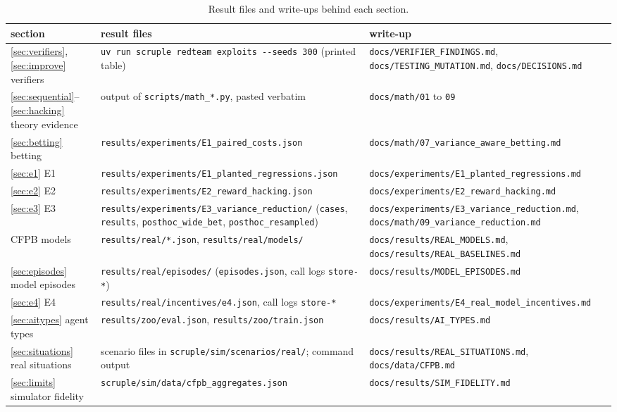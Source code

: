 \documentclass[11pt]{article}
\theoremstyle{definition}
\theoremstyle{remark}
\newcommand{\1}{\mathbf{1}}
\begin{document}
\begin{table}[h]
\centering\scriptsize
\caption{Result files and write-ups behind each section.}\label{tab:files}
\begin{tabularx}{\linewidth}{@{}l>{\raggedright\arraybackslash\hsize=0.85\hsize}X>{\raggedright\arraybackslash\hsize=1.15\hsize}X@{}}
\toprule
section & result files & write-up\\
\midrule
\ref{sec:verifiers}, \ref{sec:improve} verifiers & \texttt{uv run scruple redteam exploits -{}-seeds 300} (printed table) & \nolinkurl{docs/VERIFIER_FINDINGS.md}, \nolinkurl{docs/TESTING_MUTATION.md}, \nolinkurl{docs/DECISIONS.md}\\
\ref{sec:sequential}--\ref{sec:hacking} theory evidence & output of \nolinkurl{scripts/math_*.py}, pasted verbatim & \nolinkurl{docs/math/01} to \nolinkurl{09}\\
\ref{sec:betting} betting & \nolinkurl{results/experiments/E1_paired_costs.json} & \nolinkurl{docs/math/07_variance_aware_betting.md}\\
\ref{sec:e1} E1 & \nolinkurl{results/experiments/E1_planted_regressions.json} & \nolinkurl{docs/experiments/E1_planted_regressions.md}\\
\ref{sec:e2} E2 & \nolinkurl{results/experiments/E2_reward_hacking.json} & \nolinkurl{docs/experiments/E2_reward_hacking.md}\\
\ref{sec:e3} E3 & \nolinkurl{results/experiments/E3_variance_reduction/} (\texttt{cases}, \texttt{results}, \texttt{posthoc\_wide\_bet}, \texttt{posthoc\_resampled}) & \nolinkurl{docs/experiments/E3_variance_reduction.md}, \nolinkurl{docs/math/09_variance_reduction.md}\\
CFPB models & \nolinkurl{results/real/*.json}, \nolinkurl{results/real/models/} & \nolinkurl{docs/results/REAL_MODELS.md}, \nolinkurl{docs/results/REAL_BASELINES.md}\\
\ref{sec:episodes} model episodes & \nolinkurl{results/real/episodes/} (\texttt{episodes.json}, call logs \texttt{store-*}) & \nolinkurl{docs/results/MODEL_EPISODES.md}\\
\ref{sec:e4} E4 & \nolinkurl{results/real/incentives/e4.json}, call logs \texttt{store-*} & \nolinkurl{docs/experiments/E4_real_model_incentives.md}\\
\ref{sec:aitypes} agent types & \nolinkurl{results/zoo/eval.json}, \nolinkurl{results/zoo/train.json} & \nolinkurl{docs/results/AI_TYPES.md}\\
\ref{sec:situations} real situations & scenario files in \nolinkurl{scruple/sim/scenarios/real/}; command output & \nolinkurl{docs/results/REAL_SITUATIONS.md}, \nolinkurl{docs/data/CFPB.md}\\
\ref{sec:limits} simulator fidelity & \nolinkurl{scruple/sim/data/cfpb_aggregates.json} & \nolinkurl{docs/results/SIM_FIDELITY.md}\\
\bottomrule
\end{tabularx}
\end{table}
\end{document}

